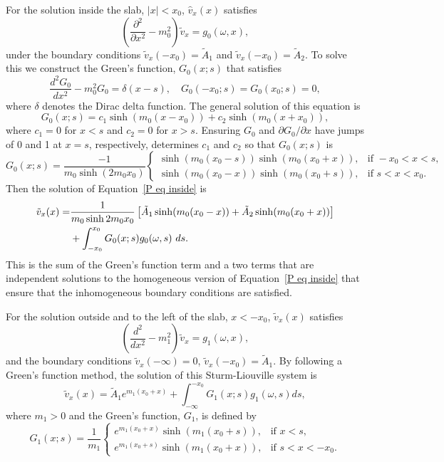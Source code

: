 \documentclass[12pt]{../style-files/ociamthesis}
\begin{document}
For the solution inside the slab, $|x| < x_0$, $\hat{v}_x(x)$ satisfies
\begin{equation}
\left( \frac{\partial^2}{\partial x^2} - m_0^2 \right) \tilde{v}_x = g_0(\omega, x),
\end{equation}
under the boundary conditions $\tilde{v}_x(-x_0) = \tilde{A}_1$ and $\tilde{v}_x(-x_0) = \tilde{A}_2$. To solve this we construct the Green's function, $G_0(x;s)$ that satisfies
\begin{equation}
\frac{d^2G_0}{dx^2} - m_0^2 G_0 = \delta(x-s), \quad G_0(-x_0;s) = G_0(x_0;s) = 0,
\end{equation}
where $\delta$ denotes the Dirac delta function. The general solution of this equation is
\begin{equation}
G_0(x;s) = c_1\sinh(m_0(x - x_0)) + c_2\sinh(m_0(x + x_0)),
\end{equation}
where $c_1 = 0$ for $x < s$ and $c_2 = 0$ for $x > s$. Ensuring $G_0$ and $\partial G_0 / \partial x$ have jumps of 0 and 1 at $x = s$, respectively, determines $c_1$ and $c_2$ so that $G_0(x;s)$ is
\begin{equation}
G_0(x;s) = \frac{-1}{m_0\sinh(2m_0 x_0)}
\begin{cases}
\sinh(m_0(x_0 - s))\sinh(m_0(x_0 + x)), & \text{if } -x_0<x<s, \\
\sinh(m_0(x_0 - x))\sinh(m_0(x_0 + s)), & \text{if } s<x<x_0.
\end{cases}
\end{equation}
Then the solution of Equation~\eqref{P eq inside} is
\begin{align}
\tilde{v}_x(x) = &\frac{1}{m_0\sinh{2m_0 x_0}} \left[ \tilde{A}_1\sinh(m_0(x_0 - x)) + \tilde{A}_2\sinh(m_0(x_0 + x)) \right] \notag \\
&+ \int_{-x_0}^{x_0} G_0(x;s) g_0(\omega, s) ~ds.
\label{V sol 0}
\end{align}
This is the sum of the Green's function term and a two terms that are independent solutions to the homogeneous version of Equation~\eqref{P eq inside} that ensure that the inhomogeneous boundary conditions are satisfied.

For the solution outside and to the left of the slab, $x < -x_0$, $\tilde{v}_x(x)$ satisfies
\begin{equation}
\left(\frac{d^2}{dx^2} - m_1^2 \right) \tilde{v}_x = g_1(\omega, x),
\end{equation}
and the boundary conditions $\tilde{v}_x(-\infty) = 0$, $\tilde{v}_x(-x_0) = \tilde{A}_1$. By following a Green's function method, the solution of this Sturm-Liouville system is
\begin{equation}
\tilde{v}_x(x) = \tilde{A}_1e^{m_1(x_0+x)} + \int_{-\infty}^{-x_0} G_1(x; s) g_1(\omega, s) ds,
\label{V sol 1}
\end{equation}
where $m_1 > 0$ and the Green's function, $G_1$, is defined by
\begin{equation}
G_1(x; s) = \frac{1}{m_1}
\begin{cases}
e^{m_1(x_0 + x)}\sinh(m_1(x_0 + s)), & \text{if } x < s, \\
e^{m_1(x_0 + s)}\sinh(m_1(x_0 + x)), & \text{if } s < x < -x_0.
\end{cases}
\end{equation}
\end{document}
